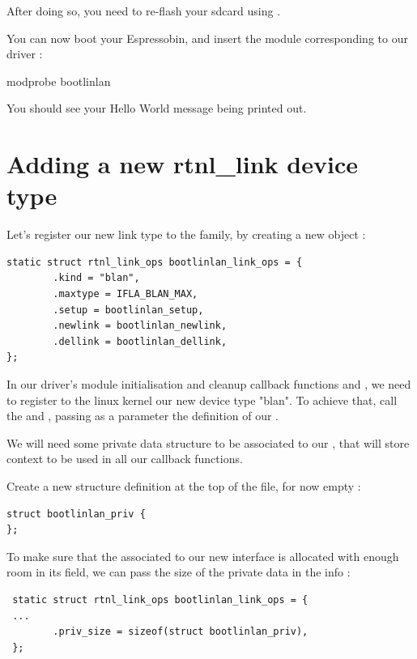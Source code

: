 After doing so, you need to re-flash your sdcard using .
 
You can now boot your Espressobin, and insert the module corresponding to our driver :
 
\begin{targetbashinput}
modprobe bootlinlan
\end{targetbashinput}
 
 You should see your Hello World message being printed out.
 
 \section{Adding a new rtnl\_link device type}
 
 Let's register our new link type to the  family, by creating a
 new  object :
 
\begin{verbatim}
static struct rtnl_link_ops bootlinlan_link_ops = {
        .kind = "blan",
        .maxtype = IFLA_BLAN_MAX,
        .setup = bootlinlan_setup,
        .newlink = bootlinlan_newlink,
        .dellink = bootlinlan_dellink,
};
\end{verbatim}

In our driver's module initialisation and cleanup callback functions  and , we need to register to the linux kernel our new device type "blan". To achieve that, call
the  and , passing as a parameter the definition
of our .

 We will need some private data structure to be associated to our , that will store context to be used in all our callback functions.

 Create a new structure definition at the top of the file, for now empty :

\begin{verbatim}
struct bootlinlan_priv {
};
\end{verbatim}

To make sure that the  associated to our new interface is allocated with enough
room in its  field, we can pass the size of the private data in the  info :

 \begin{verbatim}
 static struct rtnl_link_ops bootlinlan_link_ops = {
 ...
        .priv_size = sizeof(struct bootlinlan_priv),
 };
 \end{verbatim}
 
